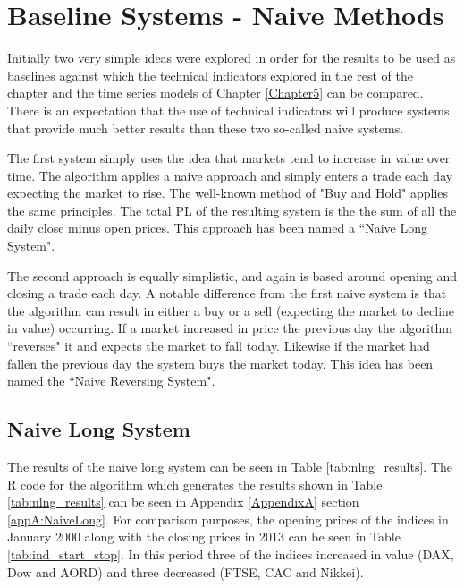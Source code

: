 \section{Baseline Systems - Naive Methods}
Initially two very simple ideas were explored in order for the results to be used as baselines against which the technical indicators explored in the rest of the chapter and the time series models of Chapter \ref{Chapter5} can be compared. There is an expectation that the use of technical indicators will produce systems that provide much better results than these two so-called naive systems.

The first system simply uses the idea that markets tend to increase in value over time. The algorithm applies a naive approach and simply enters a trade each day expecting the market to rise. The well-known method of "Buy and Hold" applies the same principles. The total PL of the resulting system is the the sum of all the daily close minus open prices. This approach has been named a \textquotedblleft Naive Long System".

The second approach is equally simplistic, and again is based around opening and closing a trade each day. A notable difference from the first naive system is that the algorithm can result in either a buy or a sell (expecting the market to decline in value) occurring. If a market increased in price the previous day the algorithm \textquotedblleft reverses" it and expects the market to fall today. Likewise if the market had fallen the previous day the system buys the market today. This idea has been named the \textquotedblleft Naive Reversing System".

\subsection{Naive Long System}
The results of the naive long system can be seen in Table \ref{tab:nlng_results}. The R code for the algorithm which generates the results shown in Table \ref{tab:nlng_results} can be seen in Appendix \ref{AppendixA} section \ref{appA:NaiveLong}. For comparison purposes, the opening prices of the indices in January 2000 along with the closing prices in 2013 can be seen in Table \ref{tab:ind_start_stop}. In this period three of the indices increased in value (DAX, Dow and AORD) and three decreased (FTSE, CAC and Nikkei).


